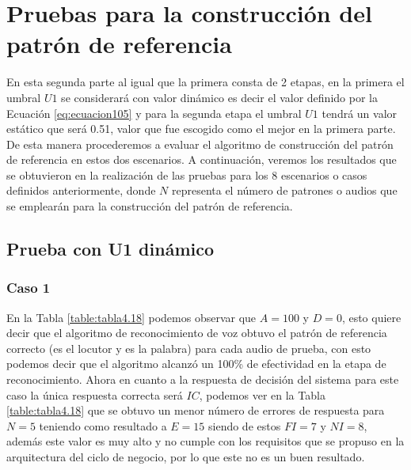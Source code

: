 \section{Pruebas para la construcción del patrón de referencia}
En esta segunda parte al igual que la primera consta de 2 etapas, en la primera el umbral $U1$ se considerará con valor dinámico es decir el valor definido por la Ecuación \eqref{eq:ecuacion105} y para la segunda etapa el umbral $U1$ tendrá un valor estático que será 0.51, valor que fue escogido como el mejor en la primera parte. De esta manera procederemos a evaluar el algoritmo de construcción del patrón de referencia en estos dos escenarios.
\vskip 0.5cm
A continuación, veremos los resultados que se obtuvieron en la realización de las pruebas para los 8 escenarios o casos definidos anteriormente, donde $N$ representa el número de patrones o audios que se emplearán para la construcción del patrón de referencia.

\subsection{Prueba con U1 dinámico}
\subsubsection{Caso 1}
En la Tabla \ref{table:tabla4.18} podemos observar que $A = 100$ y $D = 0$, esto quiere decir que el algoritmo de reconocimiento de voz obtuvo el patrón de referencia correcto (es el locutor y es la palabra) para cada audio de prueba, con esto podemos decir que el algoritmo alcanzó un 100\% de efectividad en la etapa de reconocimiento.
\vskip 0.5cm
Ahora en cuanto a la respuesta de decisión del sistema para este caso la única respuesta correcta será $IC$, podemos ver en la Tabla \ref{table:tabla4.18} que se obtuvo un menor número de errores de respuesta para $N = 5$ teniendo como resultado a $E = 15$ siendo de estos $FI = 7$ y $NI = 8$, además este valor es muy alto y no cumple con los requisitos que se propuso en la arquitectura del ciclo de negocio, por lo que este no es un buen resultado.

